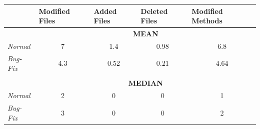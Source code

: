 \begin{table}[H]
	\centering
	\begin{tabular}{@{}lcccc@{}}
		\toprule
		& \multicolumn{1}{l}{\textbf{Modified Files}} & \multicolumn{1}{l}{\textbf{Added Files}} & \multicolumn{1}{l}{\textbf{Deleted Files}} & \multicolumn{1}{l}{\textbf{Modified Methods}} \\ \midrule
		& \multicolumn{4}{c}{\textbf{MEAN}}                                                                                                                                                   \\
		\textit{Normal}  & 7                                           & 1.4                                      & 0.98                                       & 6.8                                           \\
		\textit{Bug-Fix} & 4.3                                         & 0.52                                     & 0.21                                       & 4.64                                          \\
		& \multicolumn{1}{l}{}                        & \multicolumn{1}{l}{}                     & \multicolumn{1}{l}{}                       & \multicolumn{1}{l}{}                          \\
		& \multicolumn{4}{c}{\textbf{MEDIAN}}                                                                                                                                                 \\
		\textit{Normal}  & 2                                           & 0                                        & 0                                          & 1                                             \\
		\textit{Bug-Fix} & 3                                           & 0                                        & 0                                          & 2                                             \\ \bottomrule
	\end{tabular}
\end{table}

